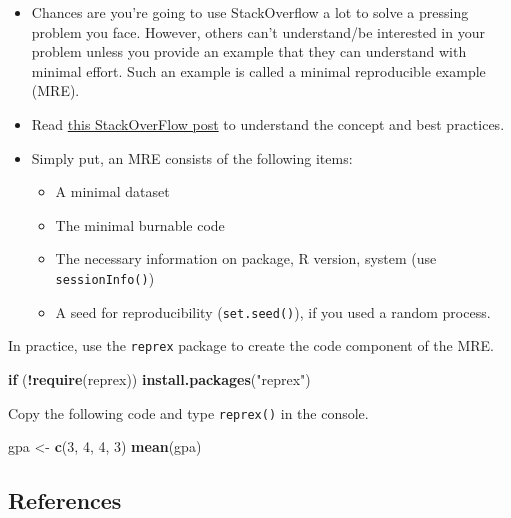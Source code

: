 \documentclass[
]{book}
\newenvironment{Shaded}{\begin{snugshade}}{\end{snugshade}}
\newcommand{\ControlFlowTok}[1]{\textcolor[rgb]{0.13,0.29,0.53}{\textbf{#1}}}
\newcommand{\DecValTok}[1]{\textcolor[rgb]{0.00,0.00,0.81}{#1}}
\newcommand{\FunctionTok}[1]{\textcolor[rgb]{0.13,0.29,0.53}{\textbf{#1}}}
\newcommand{\NormalTok}[1]{#1}
\newcommand{\OtherTok}[1]{\textcolor[rgb]{0.56,0.35,0.01}{#1}}
\newcommand{\SpecialCharTok}[1]{\textcolor[rgb]{0.81,0.36,0.00}{\textbf{#1}}}
\newcommand{\StringTok}[1]{\textcolor[rgb]{0.31,0.60,0.02}{#1}}
\providecommand{\tightlist}{%
  \setlength{\itemsep}{0pt}\setlength{\parskip}{0pt}}
\begin{document}
\begin{itemize}
\item
  Chances are you're going to use StackOverflow a lot to solve a pressing problem you face. However, others can't understand/be interested in your problem unless you provide an example that they can understand with minimal effort. Such an example is called a minimal reproducible example (MRE).
\item
  Read \href{https://stackoverflow.com/questions/5963269/how-to-make-a-great-r-reproducible-example}{this StackOverFlow post} to understand the concept and best practices.
\item
  Simply put, an MRE consists of the following items:

  \begin{itemize}
  \tightlist
  \item
    A minimal dataset
  \item
    The minimal burnable code
  \item
    The necessary information on package, R version, system (use \texttt{sessionInfo()})
  \item
    A seed for reproducibility (\texttt{set.seed()}), if you used a random process.
  \end{itemize}
\end{itemize}

In practice, use the \texttt{reprex} package to create the code component of the MRE.

\begin{Shaded}
\begin{Highlighting}[]
\ControlFlowTok{if}\NormalTok{ (}\SpecialCharTok{!}\FunctionTok{require}\NormalTok{(reprex)) }\FunctionTok{install.packages}\NormalTok{(}\StringTok{"reprex"}\NormalTok{)}
\end{Highlighting}
\end{Shaded}

Copy the following code and type \texttt{reprex()} in the console.

\begin{Shaded}
\begin{Highlighting}[]
\NormalTok{gpa }\OtherTok{\textless{}{-}} \FunctionTok{c}\NormalTok{(}\DecValTok{3}\NormalTok{, }\DecValTok{4}\NormalTok{, }\DecValTok{4}\NormalTok{, }\DecValTok{3}\NormalTok{)}
\FunctionTok{mean}\NormalTok{(gpa)}
\end{Highlighting}
\end{Shaded}

\subsection{References}\label{references-2}
\end{document}

